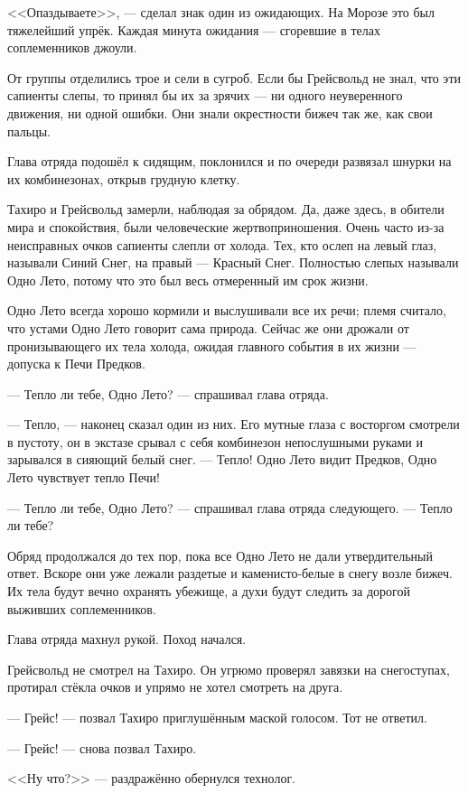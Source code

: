 <<Опаздываете>>, --- сделал знак один из ожидающих.
На Морозе это был тяжелейший упрёк.
Каждая минута ожидания --- сгоревшие в телах соплеменников джоули.

От группы отделились трое и сели в сугроб.
Если бы Грейсвольд не знал, что эти сапиенты слепы, то принял бы их за зрячих --- ни одного неуверенного движения, ни одной ошибки.
Они знали окрестности бижеч так же, как свои пальцы.

Глава отряда подошёл к сидящим, поклонился и по очереди развязал шнурки на их комбинезонах, открыв грудную клетку.

Тахиро и Грейсвольд замерли, наблюдая за обрядом.
Да, даже здесь, в обители мира и спокойствия, были человеческие жертвоприношения.
Очень часто из-за неисправных очков сапиенты слепли от холода.
Тех, кто ослеп на левый глаз, называли Синий Снег, на правый --- Красный Снег.
Полностью слепых называли Одно Лето, потому что это был весь отмеренный им срок жизни.

Одно Лето всегда хорошо кормили и выслушивали все их речи;
племя считало, что устами Одно Лето говорит сама природа.
Сейчас же они дрожали от пронизывающего их тела холода, ожидая главного события в их жизни --- допуска к Печи Предков.

--- Тепло ли тебе, Одно Лето? --- спрашивал глава отряда.

--- Тепло, --- наконец сказал один из них.
Его мутные глаза с восторгом смотрели в пустоту, он в экстазе срывал с себя комбинезон непослушными руками и зарывался в сияющий белый снег.
--- Тепло!
Одно Лето видит Предков, Одно Лето чувствует тепло Печи!

--- Тепло ли тебе, Одно Лето? --- спрашивал глава отряда следующего.
--- Тепло ли тебе?

Обряд продолжался до тех пор, пока все Одно Лето не дали утвердительный ответ.
Вскоре они уже лежали раздетые и каменисто-белые в снегу возле бижеч.
Их тела будут вечно охранять убежище, а духи будут следить за дорогой выживших соплеменников.

Глава отряда махнул рукой.
Поход начался.

Грейсвольд не смотрел на Тахиро.
Он угрюмо проверял завязки на снегоступах, протирал стёкла очков и упрямо не хотел смотреть на друга.

--- Грейс! --- позвал Тахиро приглушённым маской голосом.
Тот не ответил.

--- Грейс! --- снова позвал Тахиро.

<<Ну что?>> --- раздражённо обернулся технолог.

